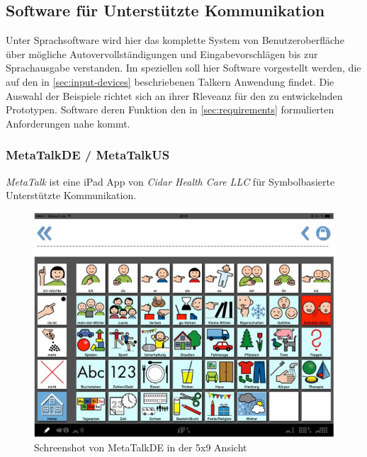     \subsection{Software für Unterstützte Kommunikation}
    \label{sec:software-examples}
    
    	Unter Sprachsoftware wird hier das komplette System von Benutzeroberfläche über mögliche Autovervollständigungen und Eingabevorschlägen bis zur Sprachausgabe verstanden. Im speziellen soll hier Software vorgestellt werden, die auf den in \autoref{sec:input-devices} beschriebenen Talkern Anwendung findet. Die Auswahl der Beispiele richtet sich an ihrer Rleveanz für den zu entwickelnden Prototypen. Software deren Funktion den in \autoref{sec:requirements} formulierten Anforderungen nahe kommt.
        
        \subsubsection*{MetaTalkDE / MetaTalkUS}
        	\emph{MetaTalk} ist eine iPad App von \emph{Cidar Health Care LLC} für Symbolbasierte Unterstützte Kommunikation.
            
            \begin{figure}[H]
				\centering
				\includegraphics[width=.7\linewidth]{images/Metatalk.png}
                \caption{Schreenshot von MetaTalkDE in der 5x9 Ansicht
                \parencite[S. 8]{cidar:metaTalkManual}}
				\label{fig:metatalk}
			\end{figure}
            
